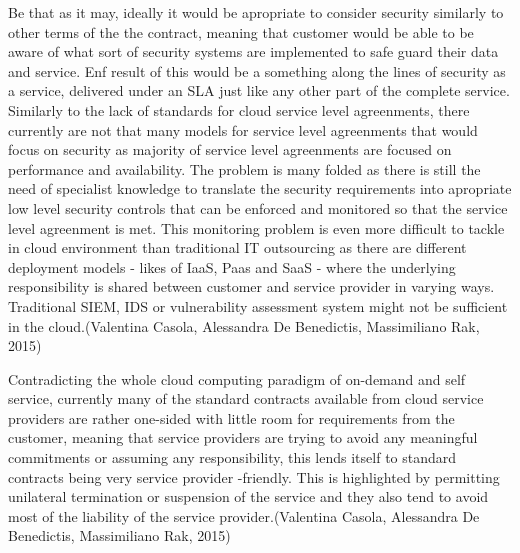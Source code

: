 \documentclass{article}
\begin{document}
Be that as it may, ideally it would be apropriate to consider security similarly to other terms of the the contract, meaning that customer would be able to be aware of what sort of security systems are implemented to safe guard their data and service. Enf result of this would be a something along the lines of security as a service, delivered under an SLA just like any other part of the complete service. Similarly to the lack of standards for cloud service level agreenments, there currently are not that many models for service level agreenments that would focus on security as majority of service level agreenments are focused on performance and availability. The problem is many folded as there is still the need of specialist knowledge to translate the security requirements into apropriate low level security controls that can be enforced and monitored so that the service level agreenment is met. This monitoring problem is even more difficult to tackle in cloud environment than traditional IT outsourcing as there are different deployment models - likes of IaaS, Paas and SaaS - where the underlying responsibility is shared between customer and service provider in varying ways. Traditional SIEM, IDS or vulnerability assessment system might not be sufficient in the cloud.(Valentina Casola, Alessandra De Benedictis, Massimiliano Rak, 2015)
\par
Contradicting the whole cloud computing paradigm of on-demand and self service, currently many of the standard contracts available from cloud service providers are rather one-sided with little room for requirements from the customer, meaning that service providers are trying to avoid any meaningful commitments or assuming any responsibility, this lends itself to standard contracts being very service provider -friendly. This is highlighted by permitting unilateral termination or suspension of the service and they also tend to avoid most of the liability of the service provider.(Valentina Casola, Alessandra De Benedictis, Massimiliano Rak, 2015)
\end{document}
